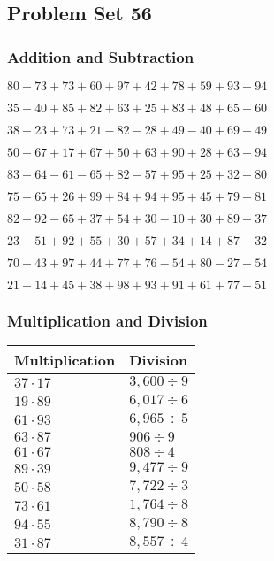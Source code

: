 \hypertarget{problem-set-56}{%
\subsection{Problem Set 56}\label{problem-set-56}}

\hypertarget{addition-and-subtraction}{%
\subsubsection{Addition and
Subtraction}\label{addition-and-subtraction}}

\(80+73+73+60+97+42+78+59+93+94\)

\(35+40+85+82+63+25+83+48+65+60\)

\(38+23+73+21-82-28+49-40+69+49\)

\(50+67+17+67+50+63+90+28+63+94\)

\(83+64-61-65+82-57+95+25+32+80\)

\(75+65+26+99+84+94+95+45+79+81\)

\(82+92-65+37+54+30-10+30+89-37\)

\(23+51+92+55+30+57+34+14+87+32\)

\(70-43+97+44+77+76-54+80-27+54\)

\(21+14+45+38+98+93+91+61+77+51\)

\hypertarget{multiplication-and-division}{%
\subsubsection{Multiplication and
Division}\label{multiplication-and-division}}

\begin{longtable}[]{@{}ll@{}}
\toprule
Multiplication & Division\tabularnewline
\midrule
\endhead
\(37\cdot17\) & \(3,600÷9\)\tabularnewline
\(19\cdot89\) & \(6,017÷6\)\tabularnewline
\(61\cdot93\) & \(6,965÷5\)\tabularnewline
\(63\cdot87\) & \(906÷9\)\tabularnewline
\(61\cdot67\) & \(808÷4\)\tabularnewline
\(89\cdot39\) & \(9,477÷9\)\tabularnewline
\(50\cdot58\) & \(7,722÷3\)\tabularnewline
\(73\cdot61\) & \(1,764÷8\)\tabularnewline
\(94\cdot55\) & \(8,790÷8\)\tabularnewline
\(31\cdot87\) & \(8,557÷4\)\tabularnewline
\bottomrule
\end{longtable}
